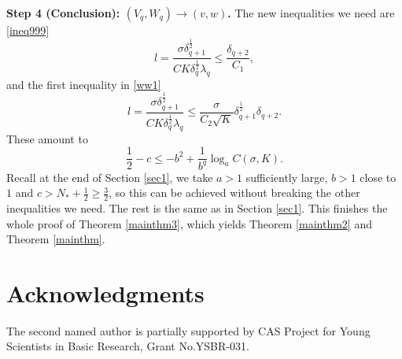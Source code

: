 \documentclass[reqno,12pt]{amsart}
\numberwithin{equation}{section}
\theoremstyle{plain}
\theoremstyle{definition}
\begin{document}
\textbf{Step 4 (Conclusion): $(V_q,W_q)\to(v,w)$.}
The new inequalities we need are \eqref{ineq999}
\[
l=\frac{\sigma\delta_{q+1}^\frac{1}{2}}{CK\delta_q^\frac{1}{2}\lambda_q}\le \frac{\delta_{q+2}}{C_1},
\]
and the first inequality in \eqref{ww1}
\begin{equation*}
    l=\frac{\sigma\delta_{q+1}^\frac{1}{2}}{CK\delta_q^\frac{1}{2}\lambda_q}\le \frac{\sigma}{C_2\sqrt{K}}\delta_{q+1}^{\frac{1}{2}}\delta_{q+2}.
\end{equation*}
These amount to
\begin{equation*}
    \frac{1}{2}-c\le -b^2+\frac{1}{b^q}\log_a C(\sigma, K).
\end{equation*}
Recall at the end of Section \ref{sec1}, we take $a>1$ sufficiently large, $b>1$ close to $1$ and $c>N_*+\frac{1}{2}\ge\frac{3}{2}$, so this can be achieved without breaking the other inequalities we need. The rest is the same as in Section \ref{sec1}. This finishes the whole proof of Theorem \ref{mainthm3}, which yields Theorem \ref{mainthm2} and Theorem \ref{mainthm}.



\section*{Acknowledgments}
The second named author is partially supported by CAS Project for Young Scientists in Basic Research, Grant No.YSBR-031.

\appendix



\small



\end{document}

